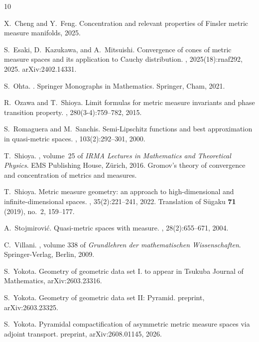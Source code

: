\documentclass{amsart}
\theoremstyle{plain}
\theoremstyle{definition}
\theoremstyle{remark}
\begin{document}
\begin{thebibliography}{10}

X.~Cheng and Y.~Feng.
\newblock Concentration and relevant properties of {Finsler} metric measure
  manifolds, 2025.

S.~Esaki, D.~Kazukawa, and A.~Mitsuishi.
\newblock Convergence of cones of metric measure spaces and its application to
  {C}auchy distribution.
, 2025(18):rnaf292, 2025.
\newblock arXiv:2402.14331.

S.~Ohta.
.
\newblock Springer Monographs in Mathematics. Springer, Cham, 2021.

R.~Ozawa and T.~Shioya.
\newblock Limit formulas for metric measure invariants and phase transition
  property.
, 280(3-4):759--782, 2015.

S.~Romaguera and M.~Sanchis.
\newblock Semi-{Lipschitz} functions and best approximation in quasi-metric
  spaces.
, 103(2):292--301, 2000.

T.~Shioya.
, volume~25 of {\em IRMA Lectures in
  Mathematics and Theoretical Physics}.
\newblock EMS Publishing House, Z\"urich, 2016.
\newblock Gromov's theory of convergence and concentration of metrics and
  measures.

T.~Shioya.
\newblock Metric measure geometry: an approach to high-dimensional and
  infinite-dimensional spaces.
, 35(2):221--241, 2022.
\newblock Translation of S\={u}gaku \textbf{71} (2019), no.~2, 159--177.

A.~Stojmirovi{\'c}.
\newblock Quasi-metric spaces with measure.
, 28(2):655--671, 2004.

C.~Villani.
, volume 338 of {\em Grundlehren der
  mathematischen Wissenschaften}.
\newblock Springer-Verlag, Berlin, 2009.

S.~Yokota.
\newblock Geometry of geometric data set {I}.
\newblock to appear in Tsukuba Journal of Mathematics, arXiv:2603.23316.

S.~Yokota.
\newblock Geometry of geometric data set {II}: {P}yramid.
\newblock preprint, arXiv:2603.23325.

S.~Yokota.
\newblock Pyramidal compactification of asymmetric metric measure spaces via
  adjoint transport.
\newblock preprint, arXiv:2608.01145, 2026.

\end{thebibliography}
\end{document}
